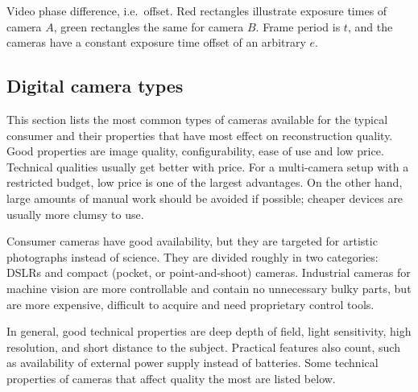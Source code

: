 
{Video phase difference, i.e.~offset.
Red rectangles illustrate exposure times of camera $A$, green rectangles the same for camera $B$.
Frame period is $t$, and the cameras have a constant exposure time offset of an arbitrary $e$.}


\subsection{Digital camera types} \label{sec:cameratypes} %


This section lists the most common types of cameras available for the typical consumer and their properties that have most effect on reconstruction quality.
Good properties are image quality, configurability, ease of use and low price.
Technical qualities usually get better with price.
For a multi-camera setup with a restricted budget, low price is one of the largest advantages.
On the other hand, large amounts of manual work should be avoided if possible; cheaper devices are usually more clumsy to use.


Consumer cameras have good availability, but they are targeted for artistic photographs instead of science.
They are divided roughly in two categories: DSLRs and compact (pocket, or point-and-shoot) cameras.
Industrial cameras for machine vision are more controllable and contain no unnecessary bulky parts, but are more expensive, difficult to acquire and need proprietary control tools.

In general, good technical properties are deep depth of field, light sensitivity, high resolution, and short distance to the subject.
Practical features also count, such as availability of external power supply instead of batteries.
Some technical properties of cameras that affect quality the most are listed below.

